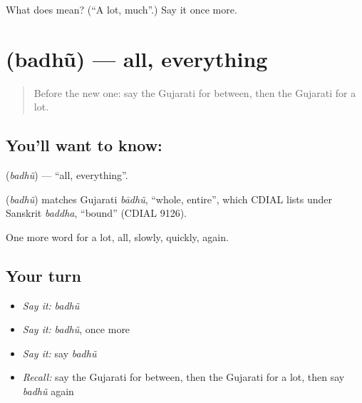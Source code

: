\begin{tcolorbox}[breakable,colback=teal!4,colframe=teal!35!black,title={Before you move on}]
What does  mean? (\textquotedblleft{}A lot, much\textquotedblright{}.) Say it once more.
\end{tcolorbox}
\section[\texorpdfstring{\gu{બધું} (badhũ)}{બધું (badhũ)}]{ (badhũ) — all, everything}

\label{lesson:GU-C76-all}



\begin{quote}
Before the new one: say the Gujarati for between, then the Gujarati for a lot.
\end{quote}

\subsection*{You'll want to know: }
\textbf{} (\emph{badhũ}) — \textquotedblleft{}all, everything\textquotedblright{}.

\begin{cousinweb}
\textbf{} (\emph{badhũ}) matches Gujarati \emph{bādhũ}, \textquotedblleft{}whole, entire\textquotedblright{}, which CDIAL lists under Sanskrit \emph{baddha}, \textquotedblleft{}bound\textquotedblright{} (CDIAL 9126).
\end{cousinweb}

\begin{grammarlens}[title={What you've built}]
One more word for a lot, all, slowly, quickly, again.
\end{grammarlens}

\subsection*{Your turn}
\begin{itemize}
\raggedright
  \item \emph{Say it:} \emph{badhũ}
  \item \emph{Say it:} \emph{badhũ}, once more
  \item \emph{Say it:} say \emph{badhũ}
  \item \emph{Recall:} say the Gujarati for between, then the Gujarati for a lot, then say \emph{badhũ} again
\end{itemize}

